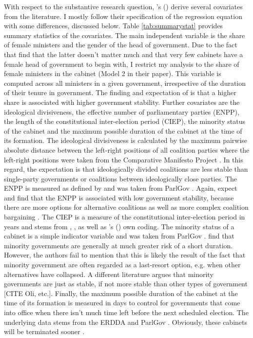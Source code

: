 \documentclass[11pt]{article}
\newcommand\possecite[1]{\citeauthor{#1}'s (\citeyear{#1})}
\begin{document}
With respect to the substantive research question, \possecite{KK20} derive several covariates from the literature. I mostly follow their specification of the regression equation with some differences, discussed below. Table \ref{tab:summarystat} provides summary statistics of the covariates. The main independent variable is the share of female ministers and the gender of the head of government. Due to the fact that \textcite{KK20} find that the latter doesn't matter much and that very few cabinets have a female head of government to begin with, I restrict my analysis to the share of female ministers in the cabinet (Model 2 in their paper). This variable is computed across all ministers in a given government, irrespective of the duration of their tenure in government. The finding and expectation of \textcite{KK20} is that a higher share is associated with higher government stability. Further covariates are the ideological divisiveness, the effective number of parliamentary parties (ENPP), the length of the constitutional inter-election period (CIEP), the minority status of the cabinet and the maximum possible duration of the cabinet at the time of its formation. The ideological divisiveness is calculated by the maximum pairwise absolute distance between the left-right positions of all coalition parties where the left-right positions were taken from the Comparative Manifesto Project \parencite{CMP2018}. In this regard, the expectation is that ideologically divided coalitions are less stable than single-party governments or coalitions between ideologically close parties. The ENPP is measured as defined by \textcite{LaaksoTaagepera1979} and was taken from ParlGov \parencite{parlgov}. Again, \textcite{KK20} expect and find that the ENPP is associated with low government stability, because there are more options for alternative coalitions as well as more complex coalition bargaining \parencite[c.f.][]{Saalfeld2008}. The CIEP is a measure of the constitutional inter-election period in years and stems from \textcite{MullerStrom2008}, \textcite{Krauss2018}, as well as \possecite{KK20} own coding. The minority status of a cabinet is a simple indicator variable and was taken from ParlGov \parencite{parlgov}. \textcite{KK20} find that minority governments are generally at much greater risk of a short duration. However, the authors fail to mention that this is likely the result of the fact that minority government are often regarded as a last-resort option, e.g. when other alternatives have collapsed. A different literature argues that minority governments are just as stable, if not more stable than other types of government [CITE Oli, etc.]. Finally, the maximum possible duration of the cabinet at the time of its formation is measured in days to control for governments that come into office when there isn't much time left before the next scheduled election. The underlying data stems from the ERDDA \parencite{ERD2014} and ParlGov \parencite{parlgov}. Obviously, these cabinets will be terminated sooner \parencite{KK20}. 
\end{document}
